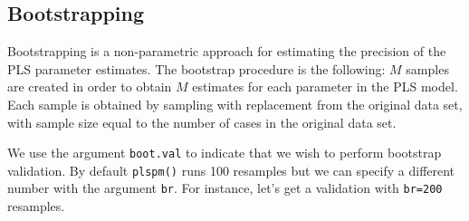 \documentclass[12pt]{book}\usepackage{graphicx, color}
\newcommand{\fplspm}{\texttt{plspm()}}
\newcommand{\code}[1]{\texttt{#1}}
\begin{document}
\subsection{Bootstrapping}
Bootstrapping is a non-parametric approach for estimating the precision of the PLS parameter estimates. The bootstrap procedure is the following: $M$ samples are created in order to obtain $M$ estimates for each parameter in the PLS model. Each sample is obtained by sampling with replacement from the original data set, with sample size equal to the number of cases in the original data set. 

We use the argument \code{boot.val} to indicate that we wish to perform bootstrap validation. By default \fplspm{} runs 100 resamples but we can specify a different number with the argument \code{br}. For instance, let's get a validation with \code{br=200} resamples. 
\end{document}
